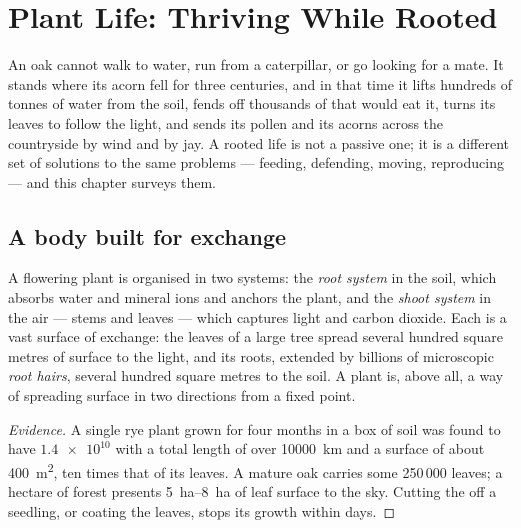 \chapter{Plant Life: Thriving While Rooted}\label{ch:g12:plant-rooted-life}

An oak cannot walk to water, run from a caterpillar, or go looking for
a mate. It stands where its acorn fell for three centuries, and in that
time it lifts hundreds of tonnes of water from the soil, fends off
thousands of  that would eat it, turns its leaves to follow the
light, and sends its pollen and its acorns across the countryside by
wind and by jay. A rooted life is not a passive one; it is a different
set of solutions to the same problems --- feeding, defending, moving,
reproducing --- and this chapter surveys them.

\section{A body built for exchange}

\begin{proposition}\label{prop:g12:plant-rooted-life:surfaces}
A flowering plant is organised in two systems: the \emph{root system}
in the soil, which absorbs water and mineral ions and anchors the
plant, and the \emph{shoot system} in the air --- stems and leaves ---
which captures light and carbon dioxide. Each is a vast surface of
exchange: the leaves of a large tree spread several hundred square
metres of surface to the light, and its roots, extended by billions of
microscopic \emph{root hairs}, several hundred square
metres to the soil. A plant is, above all, a way of spreading surface
in two directions from a fixed point.
\end{proposition}
\begin{proof}[Evidence]
A single rye plant grown for four months in a box of soil was found to
have $\num{1.4e10}$  with a total length of over
\qty{10000}{km} and a surface of about \qty{400}{m^2}, ten times that
of its leaves. A mature oak carries some 250\,000 leaves; a hectare of
forest presents \qtyrange{5}{8}{ha} of leaf surface to the sky.
Cutting the  off a seedling, or coating the leaves, stops
its growth within days.
\end{proof}

